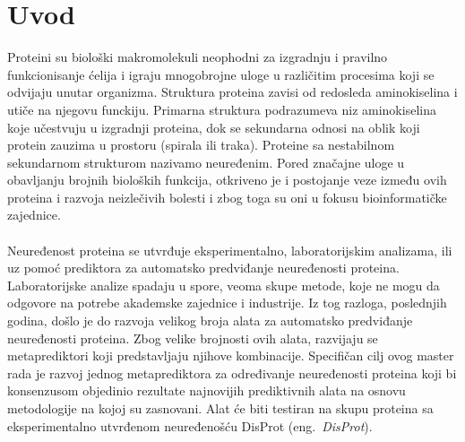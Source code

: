 
\chapter{Uvod} %

\label{Chapter1} %


Proteini su biološki makromolekuli neophodni za izgradnju i pravilno funkcionisanje ćelija i igraju mnogobrojne uloge u različitim procesima koji se odvijaju unutar organizma. Struktura proteina zavisi od redosleda aminokiselina i utiče na njegovu funckiju. Primarna struktura podrazumeva niz aminokiselina koje učestvuju u izgradnji proteina, dok se sekundarna odnosi na oblik koji protein zauzima u prostoru (spirala ili traka). Proteine sa nestabilnom sekundarnom strukturom nazivamo neuređenim. Pored značajne uloge u obavljanju brojnih bioloških funkcija, otkriveno je i postojanje veze između ovih proteina i razvoja neizlečivih bolesti i zbog toga su oni u fokusu bioinformatičke zajednice.\\\\

Neuređenost proteina se utvrđuje eksperimentalno, laboratorijskim analizama, ili uz pomoć prediktora za automatsko predviđanje neuređenosti proteina. Laboratorijske analize spadaju u spore, veoma skupe metode, koje ne mogu da odgovore na potrebe akademske zajednice i industrije. Iz tog razloga, poslednjih godina, došlo je do razvoja velikog broja alata za automatsko predviđanje neuređenosti proteina. Zbog velike brojnosti ovih alata, razvijaju se metaprediktori koji predstavljaju njihove kombinacije. Specifičan cilj ovog master rada je razvoj jednog metaprediktora za određivanje neuređenosti proteina koji bi konsenzusom objedinio rezultate najnovijih prediktivnih alata na osnovu metodologije na kojoj su zasnovani. Alat će biti testiran na skupu proteina sa eksperimentalno utvrđenom neuređenošću DisProt (eng.~{\em DisProt}).